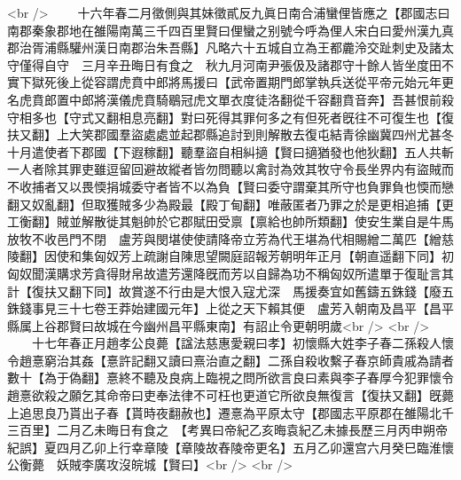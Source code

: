 <br />
　　十六年春二月徵側與其妹徵貳反九眞日南合浦蠻俚皆應之【郡國志曰南郡秦象郡地在雒陽南萬三千四百里賢曰俚蠻之别號今呼為俚人宋白曰愛州漢九真郡治胥浦縣驩州漢日南郡治朱吾縣】凡略六十五城自立為王都麊泠交趾刺史及諸太守僅得自守　三月辛丑晦日有食之　秋九月河南尹張伋及諸郡守十餘人皆坐度田不實下獄死後上從容謂虎賁中郎將馬援曰【武帝置期門郎掌執兵送從平帝元始元年更名虎賁郎置中郎將漢儀虎賁騎鶡冠虎文單衣度徒洛翻從千容翻賁音奔】吾甚恨前殺守相多也【守式又翻相息亮翻】對曰死得其罪何多之有但死者旣往不可復生也【復扶又翻】上大笑郡國羣盜處處並起郡縣追討到則解散去復屯結青徐幽冀四州尤甚冬十月遣使者下郡國【下遐稼翻】聽羣盜自相糾擿【賢曰擿猶發也他狄翻】五人共斬一人者除其罪吏雖逗留回避故縱者皆勿問聽以禽討為效其牧守令長坐界内有盜賊而不收捕者又以畏愞捐城委守者皆不以為負【賢曰委守謂棄其所守也負罪負也愞而戀翻又奴亂翻】但取獲賊多少為殿最【殿丁甸翻】唯蔽匿者乃罪之於是更相追捕【更工衡翻】賊並解散徙其魁帥於它郡賦田受禀【禀給也帥所類翻】使安生業自是牛馬放牧不收邑門不閉　盧芳與閔堪使使請降帝立芳為代王堪為代相賜繒二萬匹【繒慈陵翻】因使和集匈奴芳上疏謝自陳思望闕庭詔報芳朝明年正月【朝直遥翻下同】初匈奴聞漢購求芳貪得財帛故遣芳還降旣而芳以自歸為功不稱匈奴所遣單于復耻言其計【復扶又翻下同】故賞遂不行由是大恨入寇尤深　馬援奏宜如舊鑄五銖錢【廢五銖錢事見三十七卷王莽始建國元年】上從之天下賴其便　盧芳入朝南及昌平【昌平縣属上谷郡賢曰故城在今幽州昌平縣東南】有詔止令更朝明歲<br />
<br />
　　十七年春正月趙孝公良薨【諡法慈惠愛親曰孝】初懷縣大姓李子春二孫殺人懷令趙憙窮治其姦【憙許記翻又讀曰熹治直之翻】二孫自殺收繫子春京師貴戚為請者數十【為于偽翻】憙終不聽及良病上臨視之問所欲言良曰素與李子春厚今犯罪懷令趙憙欲殺之願乞其命帝曰吏奉法律不可枉也更道它所欲良無復言【復扶又翻】旣薨上追思良乃貰出子春【貰時夜翻赦也】遷憙為平原太守【郡國志平原郡在雒陽北千三百里】二月乙未晦日有食之　【考異曰帝紀乙亥晦袁紀乙未據長歷三月丙申朔帝紀誤】夏四月乙卯上行幸章陵【章陵故舂陵帝更名】五月乙卯還宫六月癸巳臨淮懷公衡薨　妖賊李廣攻沒皖城【賢曰】<br />
<br />
